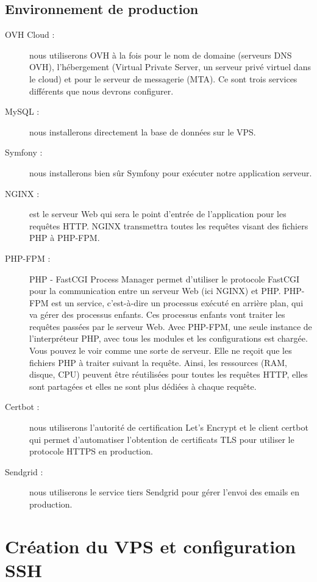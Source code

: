 \documentclass{article}
\begin{document}
\subsection{Environnement de production}
\begin{description}
    \item[OVH Cloud : ]  nous utiliserons OVH à la fois pour le nom de domaine (serveurs DNS OVH), l'hébergement (Virtual Private Server, un serveur privé virtuel dans le cloud) et pour le serveur de messagerie (MTA). Ce sont trois services différents que nous devrons configurer.

    \item[MySQL : ] nous installerons directement la base de données sur le VPS.

    \item[Symfony : ] nous installerons bien sûr Symfony pour exécuter notre application serveur.

    \item[NGINX : ] est le serveur Web qui sera le point d'entrée de l'application pour les requêtes HTTP. NGINX transmettra toutes les requêtes visant des fichiers PHP à PHP-FPM.

    \item[PHP-FPM : ] PHP - FastCGI Process Manager permet d'utiliser le protocole FastCGI pour la communication entre un serveur Web (ici NGINX) et PHP. PHP-FPM est un service, c'est-à-dire un processus exécuté en arrière plan, qui va gérer des processus enfants. Ces processus enfants vont traiter les requêtes passées par le serveur Web. Avec PHP-FPM, une seule instance de l'interpréteur PHP, avec tous les modules et les configurations est chargée. Vous pouvez le voir comme une sorte de serveur. Elle ne reçoit que les fichiers PHP à traiter suivant la requête. Ainsi, les ressources (RAM, disque, CPU) peuvent être réutilisées pour toutes les requêtes HTTP, elles sont partagées et elles ne sont plus dédiées à chaque requête.

    \item[Certbot : ] nous utiliserons l'autorité de certification Let's Encrypt et le client certbot qui permet d'automatiser l'obtention de certificats TLS pour utiliser le protocole HTTPS en production.

    \item[Sendgrid : ] nous utiliserons le service tiers Sendgrid pour gérer l'envoi des emails en production.
\end{description}

\section{Création du VPS et configuration SSH}  
\end{document}
